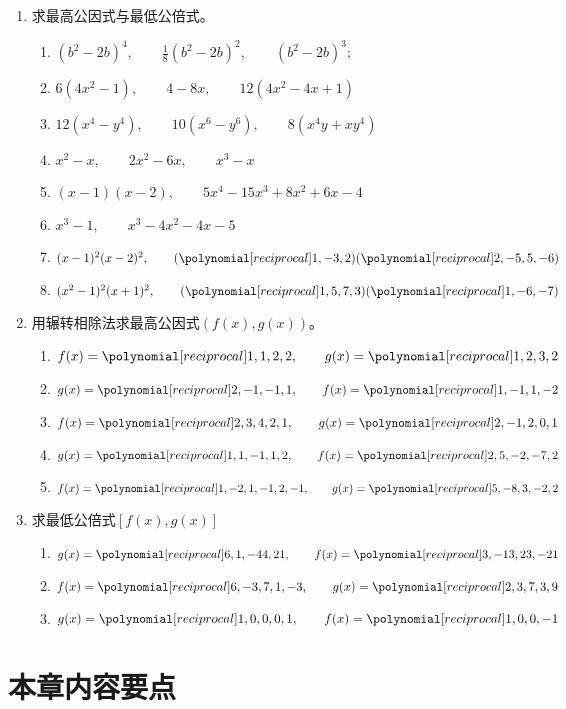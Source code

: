 \begin{enumerate}
\item 求最高公因式与最低公倍式。
\begin{enumerate}
\item $\left(b^{2}-2 b\right)^{4},\qquad   \frac{1}{8}\left(b^{2}-2 b\right)^{2},\qquad  \left(b^{2}-2 b\right)^{3} ;$
\item $6\left(4 x^{2}-1\right),\qquad   4-8 x ,\qquad   12\left(4 x^{2}-4 x + 1\right)$
\item $12\left(x^{4}-y^{4}\right),\qquad   10\left(x^{6}-y^{6}\right),\qquad   8\left(x^{4} y+x y^{4}\right)$
\item $x^{2}-x, \qquad  2 x^{2}-6 x,\qquad   x^{3}-x$
\item $(x-1)(x-2),\qquad   5 x^{4}-15 x^{3}+8 x^{2}+6 x-4$
\item $x^{3}-1,\qquad   x^{3}-4 x^{2}-4 x-5$
\item $(x-1)^{2}(x-2)^{2},\qquad (\poly{1,-3,2})(\poly{2,-5,5,-6})$
\item $(x^2-1)^2(x+1)^2,\qquad (\poly{1,5,7,3})(\poly{1,-6,-7})$
\end{enumerate}

\item 用辗转相除法求最高公因式$(f(x),g(x))$。
\begin{enumerate}
    \item $f(x)=\poly{1,1,2,2},\qquad g(x)=\poly{1,2,3,2}$
    \item $g(x)=\poly{2,-1,-1,1},\qquad f(x)=\poly{1,-1,1,-2}$
    \item $f(x)=\poly{2,3,4,2,1},\qquad g(x)=\poly{2,-1,2,0,1}$
    \item $g(x)=\poly{1,1,-1,1,2},\qquad f(x)=\poly{2,5,-2,-7,2}$
    \item $f(x)=\poly{1,-2,1,-1,2,-1},\qquad g(x)=\poly{5,-8,3,-2,2}$
\end{enumerate}

\item 求最低公倍式$[f(x),g(x)]$
\begin{enumerate}
    \item $g(x)=\poly{6,1,-44,21},\qquad f(x)=\poly{3,-13,23,-21}$
    \item $f(x)=\poly{6,-3,7,1,-3},\qquad g(x)=\poly{2,3,7,3,9}$
    \item $g(x)=\poly{1,0,0,0,1},\qquad f(x)=\poly{1,0,0,-1}$
\end{enumerate}

\end{enumerate}

\section*{本章内容要点}

